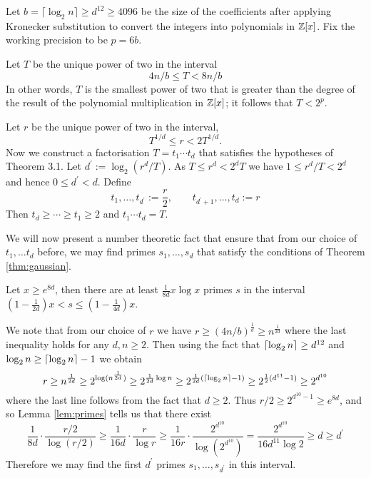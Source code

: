 Let $b = \lceil \log_2 n\rceil \geq d^{12} \geq 4096$ be the size of the coefficients after applying Kronecker substitution to convert the integers into polynomials in ${\mathbb Z}[x]$. Fix the working precision to be $p = 6b$.




Let $T$ be the unique power of two in the interval
\begin{equation}
    4n/b \leq T < 8n/b
\end{equation}
In other words, $T$ is the smallest power of two that is greater than the degree of the result of the polynomial multiplication in ${\mathbb Z}[x]$; it follows that $T < 2^p$.

Let $r$ be the unique power of two in the interval,
\[
    T^{1/d} \leq r < 2T^{1/d}.
\]
Now we construct a factorisation $T = t_1 \cdots t_d$ that satisfies the hypotheses of Theorem 3.1. Let $d^\prime := \log_2(r^d / T)$. As $T \leq r^d < 2^d T$ we have $1 \leq r^d / T < 2^d$ and hence $0 \leq d^\prime < d$. Define
\[
    t_1, \ldots, t_{d^\prime} := \frac{r}{2}, \qquad t_{d^\prime + 1} , \ldots, t_d := r
\]
Then $t_d \geq \cdots \geq t_1 \geq 2$ and $t_1\cdots t_d = T$.

\medskip

We will now present a number theoretic fact that ensure that from our choice of $t_1, \ldots t_d$ before, we may find primes $s_1, \ldots, s_d$ that satisfy the conditions of Theorem \ref{thm:gaussian}.

\begin{lemma}\label{lem:primes}
    Let $x \ge e^{8d}$, then there are at least $\frac{1}{8d}x \log x$ primes $s$ in the interval $(1 - \frac{1}{2d})x < s \le (1 - \frac{1}{4d})x$.
\end{lemma}

We note that from our choice of $r$ we have $r \ge (4n / b)^{\frac{1}{d}} \ge n^{\frac{1}{2d}}$ where the last inequality holds for any $d, n \ge 2$. Then using the fact that $\left \lceil \log_2 n \right \rceil \ge d^{12}$ and $\log_2 n \ge \left \lceil \log_2 n \right \rceil - 1$ we obtain
\[
    r \ge n^{\frac{1}{2d}} \ge 2^{\log(n^{\frac{1}{2d}})} \ge 2^{\frac{1}{2d} \log n} \ge 2^{\frac{1}{2d}(\left \lceil \log_2 n \right \rceil - 1)} \ge 2^{\frac{1}{2}(d^{11} - 1)} \ge 2^{d^{10}}
\]
where the last line follows from the fact that $d \ge 2$.
Thus $r/2 \ge 2^{d^{10} - 1} \ge e^{8d}$, and so Lemma \ref{lem:primes} tells us that there exist
\[
    \frac{1}{8d} \cdot \frac{r/2}{\log(r/2)} \ge \frac{1}{16d} \cdot \frac{r}{\log r} \ge \frac{1}{16r} \cdot \frac{2^{d^{10}}}{\log(2^{d^{10}})} = \frac{2^{d^{10}}}{16 d^{11}\log 2} \ge d\ge d^\prime
\]
Therefore we may find the first $d^\prime$ primes $s_1, \ldots, s_{d^\prime}$ in this interval.

